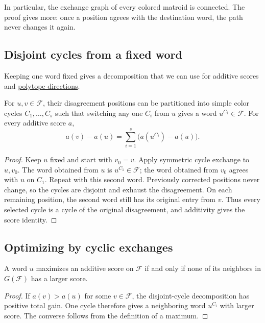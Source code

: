 In particular, the exchange graph of every colored matroid is connected. The
proof gives more: once a position agrees with the destination word, the path
never changes it again.

\subsection[disjointCycles]{Disjoint cycles from a fixed word}

Keeping one word fixed gives a decomposition that we can use for additive
scores and \href{polytope.htm#cycleCones}{polytope directions}.

\begin{lemma}
For $u,v\in\mathcal F$, their disagreement positions can be partitioned
into simple color cycles $C_1,\dotsc,C_s$ such that switching any one
$C_i$ from $u$ gives a word $u^{C_i}\in\mathcal F$. For every additive
score $a$,
\[
 a(v)-a(u)=\sum_{i=1}^s\bigl(a(u^{C_i})-a(u)\bigr).
\]
\end{lemma}

\begin{proof}
Keep $u$ fixed and start with $v_0=v$. Apply symmetric cycle exchange
to $u,v_0$. The word obtained from $u$ is $u^{C_1}\in\mathcal F$;
the word obtained from $v_0$ agrees with $u$ on $C_1$. Repeat with
this second word. Previously corrected positions never change, so
the cycles are disjoint and exhaust the disagreement. On each remaining
position, the second word still has its original entry from $v$.
Thus every selected cycle is a cycle of the original disagreement,
and additivity gives the score identity.
\end{proof}

\subsection[scoreOptimization]{Optimizing by cyclic exchanges}

\begin{theorem}
A word $u$ maximizes an additive score on $\mathcal F$ if and only if
none of its neighbors in $G(\mathcal F)$ has a larger score.
\end{theorem}

\begin{proof}
If $a(v)>a(u)$ for some $v\in\mathcal F$, the disjoint-cycle
decomposition has positive total gain. One cycle therefore gives
a neighboring word $u^{C_i}$ with larger score. The converse follows
from the definition of a maximum.
\end{proof}

